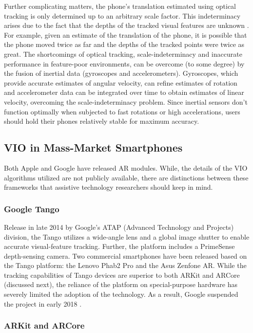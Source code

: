 \documentclass[chi_draft]{sigchi}
\begin{document}
Further complicating matters, the phone's translation estimated using optical tracking is only determined up to an arbitrary scale factor.  This indeterminacy arises due to the fact that the depths of the tracked visual features are unknown \cite{Hartley2004}.  For example, given an estimate of the translation of the phone, it is possible that the phone moved twice as far and the depths of the tracked points were twice as great.  The shortcomings of optical tracking, scale-indeterminacy and inaccurate performance in feature-poor environments, can be overcome (to some degree) by the fusion of inertial data (gyroscopes and accelerometers).  Gyroscopes, which provide accurate estimates of angular velocity, can refine estimates of rotation and accelerometer data can be integrated over time to obtain estimates of linear velocity, overcoming the scale-indeterminacy problem.  Since inertial sensors don't function optimally when subjected to fast rotations or high accelerations, users should hold their phones relatively stable for maximum accuracy.

\subsection{VIO in Mass-Market Smartphones}
Both Apple and Google have released AR modules.  While, the details of the VIO algorithms utilized are not publicly available, there are distinctions between these frameworks that assistive technology researchers should keep in mind.

\subsubsection{Google Tango}
Release in late 2014 by Google's ATAP (Advanced Technology and Projects) division, the Tango utilizes a wide-angle lens and a global image shutter to enable accurate visual-feature tracking.  Further, the platform includes a PrimeSense depth-sensing camera.  Two commercial smartphones have been released based on the Tango platform: the Lenovo Phab2 Pro and the Asus Zenfone AR.  While the tracking capabilities of Tango devices are superior to both ARKit and ARCore (discussed next), the reliance of the platform on special-purpose hardware has severely limited the adoption of the technology.  As a result, Google suspended the project in early 2018 \cite{tangoretired}.


\subsubsection{ARKit and ARCore}
\end{document}
